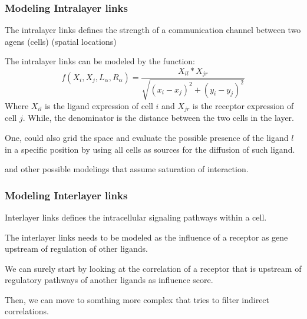\begin{frame}
    \frametitle{Modeling Intralayer links}
    The intralayer links defines the strength of a communication channel between two agens (cells) (spatial locations)
    \begin{block}{}
        The intralayer links can be modeled by the function:
        \begin{equation}
            f(X_i,X_j,L_\alpha, R_\alpha) = \frac{X_{il} * X_{jr}}{\sqrt{(x_i - x_j)^2 + (y_i - y_j)^2}} 
        \end{equation}
        Where $X_{il}$ is the ligand expression of cell $i$ and $X_{jr}$ is the receptor expression of cell $j$. While,
        the denominator is the distance between the two cells in the layer.
        
        One, could also grid the space and evaluate the possible presence of the ligand $l$ in a specific position by using all cells
        as sources for the diffusion of such ligand.

        and other possible modelings that assume saturation of interaction.
    \end{block}
\end{frame}
\begin{frame}
    \frametitle{Modeling Interlayer links}
    Interlayer links defines the intracellular signaling pathways within a cell.
    \begin{block}{}
        The interlayer links needs to be modeled as the influence of a receptor as gene upstream of regulation of other ligands.

        We can surely start by looking at the correlation of a receptor that is upstream of regulatory pathways of another ligands
        as influence score.

        Then, we can move to somthing more complex that tries to filter indirect correlations.
    \end{block}
\end{frame}

